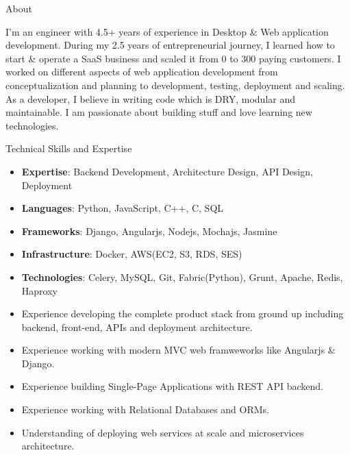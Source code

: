 \documentclass[]{mukeshcv}
\begin{document}
\thispagestyle{empty}


	\makeheader
	
	\begin{cvsection}{About}
		\begin{cvsubsection}{}{}{}
			I'm an engineer with 4.5+ years of experience in Desktop \& Web application development. During my 2.5 years of entrepreneurial journey, I learned how to start \& operate a SaaS business and scaled it from 0 to 300 paying customers. I worked on different aspects of web application development from conceptualization and planning to development, testing, deployment and scaling. As a developer, I believe in writing code which is DRY, modular and maintainable. I am passionate about building stuff and love learning new technologies.
		\end{cvsubsection}
	\end{cvsection}

	\begin{cvsection}{Technical Skills and Expertise}
		\begin{cvsubsection}{}{}{}	
			\begin{itemize}
				\item \textbf{Expertise}: Backend Development, Architecture Design, API Design, Deployment
				\item \textbf{Languages}: Python, JavaScript, C++, C, SQL
				\item \textbf{Frameworks}: Django, Angularjs, Nodejs, Mochajs, Jasmine
				\item \textbf{Infrastructure}: Docker, AWS(EC2, S3, RDS, SES)
				\item \textbf{Technologies}: Celery, MySQL, Git, Fabric(Python), Grunt, Apache, Redis, Haproxy\\
				\item Experience developing the complete product stack from ground up including backend, front-end, APIs and deployment architecture.
				\item Experience working with modern MVC web framweworks like Angularjs \& Django.
				\item Experience building Single-Page Applications with REST API backend.
				\item Experience working with Relational Databases and ORMs.
				\item Understanding of deploying web services at scale and microservices architecture.
			\end{itemize}
		\end{cvsubsection}
	\end{cvsection}
\end{document}
